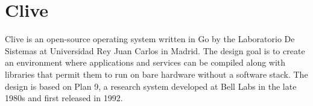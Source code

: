 \section{Clive}

Clive is an open-source operating system written in Go by
the Laboratorio De Sistemas at Universidad Rey Juan
Carlos in
Madrid\cite{hid-sp18-419-www-clive-lsub}. The design goal is to create
an environment where applications and services can be compiled along
with libraries that permit them to run on bare hardware without a
software stack\cite{hid-sp18-419-www-clive-lsub2014}. The design is
based on Plan 9, a research system developed at Bell
Labs in the late 1980s and first released in
1992\cite{hid-sp18-419-www-about-plan9}.
